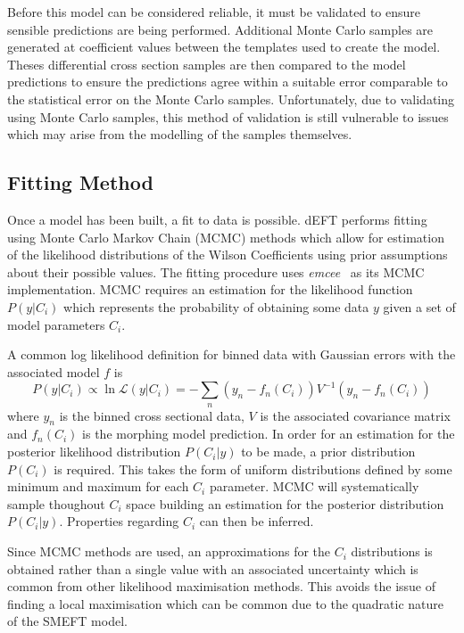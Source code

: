 \documentclass[a4paper,11pt]{article}
\begin{document}
Before this model can be considered reliable, it must be validated to ensure sensible predictions are being performed.
Additional Monte Carlo samples are generated at coefficient values between the templates used to create the model.
Theses differential cross section samples are then compared to the model predictions to ensure the predictions agree within a suitable error comparable to the statistical error on the Monte Carlo samples.
Unfortunately, due to validating using Monte Carlo samples, this method of validation is still vulnerable to issues which may arise from the modelling of the samples themselves.

\subsection{Fitting Method}\label{sec:fitting}
Once a model has been built, a fit to data is possible.
dEFT performs fitting using Monte Carlo Markov Chain (MCMC) methods which allow for estimation of the likelihood distributions of the Wilson Coefficients using prior assumptions about their possible values.
The fitting procedure uses \emph{emcee}~\cite{Foreman_Mackey_2013} as its MCMC implementation.
MCMC requires an estimation for the likelihood function $P(y | C_{i})$ which represents the probability of obtaining some data $y$ given a set of model parameters $C_{i}$.

A common log likelihood definition for binned data with Gaussian errors with the associated model $f$ is
\begin{equation}
    P(y | C_{i}) \propto \ln\mathcal{L}(y | C_{i}) = -\sum\limits_{n} (y_{n} - f_{n}(C_{i})) V^{-1} (y_{n} - f_{n}(C_{i}))
\end{equation}
where $y_{n}$ is the binned cross sectional data, $V$ is the associated covariance matrix and $f_{n}(C_{i})$ is the morphing model prediction.
In order for an estimation for the posterior likelihood distribution $P(C_{i} | y)$ to be made, a prior distribution $P(C_{i})$ is required.
This takes the form of uniform distributions defined by some minimum and maximum for each $C_{i}$ parameter.
MCMC will systematically sample thoughout $C_{i}$ space building an estimation for the posterior distribution $P(C_{i}|y)$.
Properties regarding $C_{i}$ can then be inferred.

Since MCMC methods are used, an approximations for the $C_{i}$ distributions is obtained rather than a single value with an associated uncertainty which is common from other likelihood maximisation methods.
This avoids the issue of finding a local maximisation which can be common due to the quadratic nature of the SMEFT model.
\end{document}
